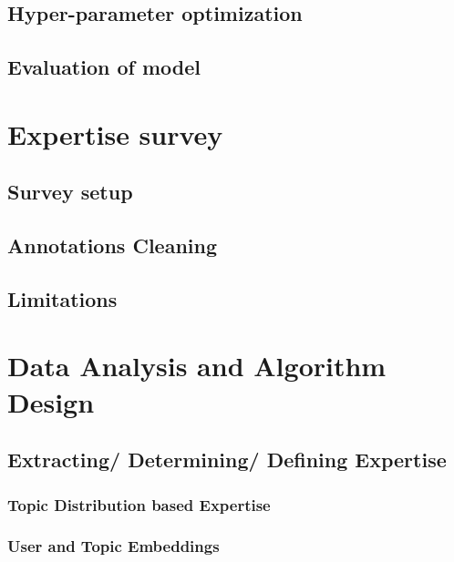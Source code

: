     \subsection{Hyper-parameter optimization}
    
    \subsection{Evaluation of model}
    
    \section{Expertise survey}
        \subsection{Survey setup}
        \subsection{Annotations Cleaning}
        \subsection{Limitations}
        
\section{Data Analysis and Algorithm Design}
    
    \subsection{Extracting/ Determining/ Defining Expertise}
    
        \subsubsection{Topic Distribution based Expertise}
        
        \subsubsection{User and Topic Embeddings}
        
